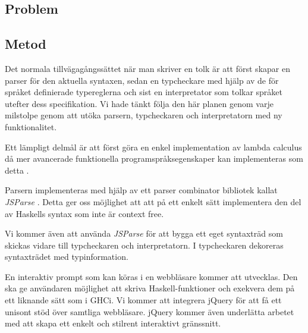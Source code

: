 \subsection{Problem} 

\subsection{Metod}
Det normala tillvägagångssättet när man skriver en tolk är att först
skapar en parser för den aktuella syntaxen, sedan en typcheckare med 
hjälp av de för språket definierade typereglerna och sist en interpretator
som tolkar språket utefter dess specifikation. Vi hade tänkt följa den här planen genom varje milstolpe genom att utöka parsern, typcheckaren och interpretatorn med ny funktionalitet.

Ett lämpligt delmål är att först göra en enkel implementation av lambda calculus då mer avancerade funktionella programspråksegenskaper kan implementeras som detta \citep{jones87}.

 Parsern implementeras med hjälp av ett parser combinator bibliotek kallat \emph{JSParse} \citep{jsparse}. Detta ger oss möjlighet att att på ett enkelt sätt implementera den del av Haskells syntax som inte är context free.

Vi kommer även att använda \emph{JSParse} för att bygga ett eget syntaxträd som skickas vidare till typcheckaren och interpretatorn. I typcheckaren dekoreras syntaxträdet med typinformation.

En interaktiv prompt som kan köras i en webbläsare kommer att utvecklas. Den ska ge användaren möjlighet att skriva Haskell-funktioner och exekvera dem på ett liknande sätt som i GHCi. 
Vi kommer att integrera jQuery \citep{jquery} för att få ett unisont stöd över samtliga webbläsare. jQuery kommer även underlätta arbetet med att skapa ett enkelt och stilrent interaktivt gränssnitt.


